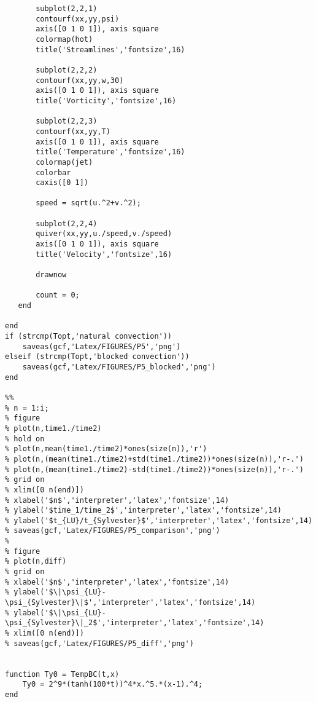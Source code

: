 \begin{verbatim}
       subplot(2,2,1)
       contourf(xx,yy,psi)
       axis([0 1 0 1]), axis square
       colormap(hot)
       title('Streamlines','fontsize',16)
        
       subplot(2,2,2)
       contourf(xx,yy,w,30)
       axis([0 1 0 1]), axis square
       title('Vorticity','fontsize',16)
      
       subplot(2,2,3)
       contourf(xx,yy,T)
       axis([0 1 0 1]), axis square
       title('Temperature','fontsize',16)
       colormap(jet)
       colorbar
       caxis([0 1])
       
       speed = sqrt(u.^2+v.^2);
       
       subplot(2,2,4)
       quiver(xx,yy,u./speed,v./speed)
       axis([0 1 0 1]), axis square
       title('Velocity','fontsize',16)
       
       drawnow
              
       count = 0;
   end

end
if (strcmp(Topt,'natural convection'))
    saveas(gcf,'Latex/FIGURES/P5','png')
elseif (strcmp(Topt,'blocked convection'))
    saveas(gcf,'Latex/FIGURES/P5_blocked','png')
end

%%
% n = 1:i;
% figure
% plot(n,time1./time2)
% hold on
% plot(n,mean(time1./time2)*ones(size(n)),'r')
% plot(n,(mean(time1./time2)+std(time1./time2))*ones(size(n)),'r-.')
% plot(n,(mean(time1./time2)-std(time1./time2))*ones(size(n)),'r-.')
% grid on
% xlim([0 n(end)])
% xlabel('$n$','interpreter','latex','fontsize',14)
% ylabel('$time_1/time_2$','interpreter','latex','fontsize',14)
% ylabel('$t_{LU}/t_{Sylvester}$','interpreter','latex','fontsize',14)
% saveas(gcf,'Latex/FIGURES/P5_comparison','png')
% 
% figure
% plot(n,diff)
% grid on
% xlabel('$n$','interpreter','latex','fontsize',14)
% ylabel('$\|\psi_{LU}-\psi_{Sylvester}\|$','interpreter','latex','fontsize',14)
% ylabel('$\|\psi_{LU}-\psi_{Sylvester}\|_2$','interpreter','latex','fontsize',14)
% xlim([0 n(end)])
% saveas(gcf,'Latex/FIGURES/P5_diff','png')


function Ty0 = TempBC(t,x)
    Ty0 = 2^9*(tanh(100*t))^4*x.^5.*(x-1).^4;
end
\end{verbatim}
